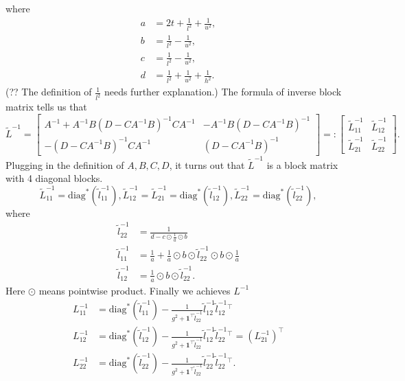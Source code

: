 \documentclass[final,onefignum,onetabnum]{siamart190516}
\begin{document}
where
\begin{equation}
    \begin{aligned}
        a &= 2t + \frac{1}{l^2} + \frac{1}{u^2},\\
        b &= \frac{1}{l^2} - \frac{1}{u^2},\\
        c &= \frac{1}{l^2} - \frac{1}{u^2},\\
        d &= \frac{1}{l^2} + \frac{1}{u^2} + \frac{1}{h^2}.
    \end{aligned}
\end{equation}
(?? The definition of $\frac{1}{l^2}$ needs further explanation.) The formula of inverse block matrix tells us that
\begin{equation}
    \widetilde{L}^{-1} = \begin{bmatrix} A^{-1} + A^{-1}B(D-CA^{-1}B)^{-1}CA^{-1} &-A^{-1}B(D-CA^{-1}B)^{-1}\\ -(D-CA^{-1}B)^{-1}CA^{-1} &(D-CA^{-1}B)^{-1}\end{bmatrix} =: \begin{bmatrix}
    \widetilde{L}^{-1}_{11} &\widetilde{L}^{-1}_{12}\\
    \widetilde{L}^{-1}_{21} &\widetilde{L}^{-1}_{22}
    \end{bmatrix}.
\end{equation}
Plugging in the definition of $A, B, C, D$, it turns out that $\widetilde{L}^{-1}$ is a block matrix with 4 diagonal blocks.
\begin{equation}
    \widetilde{L}^{-1}_{11} = \text{diag}^*(\widetilde{l}^{-1}_{11}), \widetilde{L}^{-1}_{12} = \widetilde{L}^{-1}_{21} = \text{diag}^*(\widetilde{l}^{-1}_{12}),
    \widetilde{L}^{-1}_{22} = \text{diag}^*(\widetilde{l}^{-1}_{22}),
\end{equation}
where
\begin{equation}
        \begin{aligned}
                        \widetilde{l}^{-1}_{22} &= \frac{1}{d - c\odot \frac{1}{a}\odot b}\\
        \widetilde{l}^{-1}_{11} &= \frac{1}{a} + \frac{1}{a}\odot b \odot \widetilde{l}^{-1}_{22} \odot b \odot \frac{1}{a}\\
                \widetilde{l}^{-1}_{12} &= \frac{1}{a}\odot b \odot \widetilde{l}^{-1}_{22}.
    \end{aligned}
\end{equation}
Here $\odot$ means pointwise product. Finally we achieves $L^{-1}$
\begin{equation}\label{L_inv_formula}
    \begin{aligned}
        L^{-1}_{11} &= \text{diag}^*(\widetilde{l}^{-1}_{11}) - \frac{1}{g^2+\mathbf{1}^\top \widetilde{l}^{-1}_{22}}\widetilde{l}^{-1}_{12}\widetilde{l}^{-1}_{12}^\top\\
        L^{-1}_{12} &= \text{diag}^*(\widetilde{l}^{-1}_{12}) - \frac{1}{g^2+\mathbf{1}^\top \widetilde{l}^{-1}_{22}}\widetilde{l}^{-1}_{12}\widetilde{l}^{-1}_{22}^\top = (L^{-1}_{21})^{\top}\\
        L^{-1}_{22} &= \text{diag}^*(\widetilde{l}^{-1}_{22}) - \frac{1}{g^2+\mathbf{1}^\top \widetilde{l}^{-1}_{22}}\widetilde{l}^{-1}_{22}\widetilde{l}^{-1}_{22}^\top.
    \end{aligned}
\end{equation}
\end{document}
